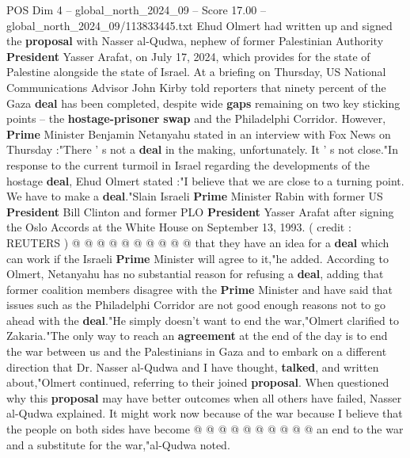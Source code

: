 \begin{textsample}{POS Dim 4 – global\_north\_2024\_09 – Score 17.00 – global\_north\_2024\_09/113833445.txt}  \label{ex:f4_pos_320}
Ehud Olmert had written up and signed the \textbf{proposal} with Nasser al-Qudwa, nephew of former Palestinian Authority \textbf{President} Yasser Arafat, on July 17, 2024, which provides for the state of Palestine alongside the state of Israel.
At a briefing on Thursday, US National Communications Advisor John Kirby told reporters that ninety percent of the Gaza \textbf{deal} has been completed, despite wide \textbf{gaps} remaining on two key sticking points -- the \textbf{hostage-prisoner} \textbf{swap} and the Philadelphi Corridor.
However, \textbf{Prime} Minister Benjamin Netanyahu stated in an interview with Fox News on Thursday :"There ' s not a \textbf{deal} in the making, unfortunately.
It ' s not close."In response to the current turmoil in Israel regarding the developments of the hostage \textbf{deal}, Ehud Olmert stated :"I believe that we are close to a turning point.
We have to make a \textbf{deal}."Slain Israeli \textbf{Prime} Minister Rabin with former US \textbf{President} Bill Clinton and former PLO \textbf{President} Yasser Arafat after signing the Oslo Accords at the White House on September 13, 1993. ( credit : REUTERS ) @ @ @ @ @ @ @ @ @ @ that they have an idea for a \textbf{deal} which can work if the Israeli \textbf{Prime} Minister will agree to it,"he added.
According to Olmert, Netanyahu has no substantial reason for refusing a \textbf{deal}, adding that former coalition members disagree with the \textbf{Prime} Minister and have said that issues such as the Philadelphi Corridor are not good enough reasons not to go ahead with the \textbf{deal}."He simply doesn't want to end the war,"Olmert clarified to Zakaria."The only way to reach an \textbf{agreement} at the end of the day is to end the war between us and the Palestinians in Gaza and to embark on a different direction that Dr.
Nasser al-Qudwa and I have thought, \textbf{talked}, and written about,"Olmert continued, referring to their joined \textbf{proposal}.
When questioned why this \textbf{proposal} may have better outcomes when all others have failed, Nasser al-Qudwa explained.
It might work now because of the war because I believe that the people on both sides have become @ @ @ @ @ @ @ @ @ @ an end to the war and a substitute for the war,"al-Qudwa noted.

\end{textsample}

